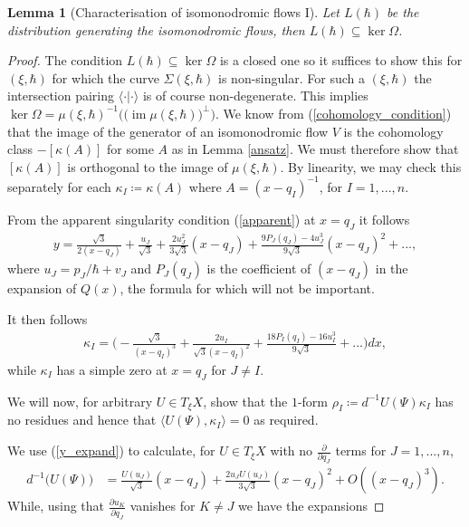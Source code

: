 \documentclass[a4paper,12pt,reqno]{amsart}
\newcounter{counter2}
\numberwithin{equation}{section}
\numberwithin{counter2}{section}
\newcounter{counter3}
\newtheorem{lemma}[counter2]{Lemma}
\newcommand{\im}{\operatorname{im}}
\begin{document}
\begin{lemma}[Characterisation of isomonodromic flows I]\label{flows_in_kernel}
 Let $L(\hbar)$ be the distribution generating the isomonodromic flows,  then $L(\hbar) \subseteq \operatorname{ker} \Omega$.
\end{lemma}
\begin{proof} The condition $L(\hbar) \subseteq \operatorname{ker} \Omega$ is a closed one so it suffices to show this for $(\xi,\hbar)$ for which the curve $\Sigma(\xi,\hbar)$ is non-singular. 
For such a  $(\xi,\hbar)$ the intersection pairing $\langle \cdot | \cdot \rangle$ is of course non-degenerate.  This implies $\operatorname{ker} \Omega =\mu(\xi,\hbar)^{-1}{( (\im \mu(\xi,\hbar)})^{\perp})$.  We know from (\ref{cohomology_condition}) that the image of the generator of an isomonodromic flow $V$ is the cohomology class $-[\kappa(A)]$ for some $A$ as in Lemma \ref{ansatz}.  We must therefore show that $[\kappa(A)]$ is orthogonal to the image of $\mu(\xi,\hbar)$.  By linearity,  we may check this separately for each $\kappa_I \coloneqq \kappa(A)$ where $A = (x-q_I)^{-1}$,  for $I = 1,...,n$.  \par 
From the apparent singularity condition (\ref{apparent}) at $x = q_J$ it follows
\begin{align}\label{y_expand}
y = \frac{\sqrt{3}}{2(x-q_J)} + \frac{u_J}{\sqrt{3}} + \frac{2u_J^2}{3\sqrt{3}}(x-q_J) + \frac{9P_J(q_J)-4u_J^3}{9\sqrt{3}}(x-q_J)^2 + ...  , 
\end{align}
where $u_J = p_J/\hbar + v_J$ and $P_J(q_J)$ is the coefficient of $(x-q_J)$ in the expansion of $Q(x)$,  the formula for which will not be important.  \par 
It then follows 
\begin{align}
\kappa_I = \Bigg( -\frac{\sqrt{3}}{(x-q_I)^3} + \frac{2u_I}{\sqrt{3}(x-q_I)^2} + \frac{18P_I(q_I)-16u_I^3}{9\sqrt{3}} + ...  \Bigg) dx,  
\end{align}
while $\kappa_I$ has a simple zero at $x = q_J$ for $J \ne I$.  \par 
We will now,   for arbitrary $U \in T_{\xi}X$,  show that the $1$-form $
\rho_I \coloneqq d^{-1} U(\Psi) \kappa_I 
$  has no residues and hence that $\langle U(\Psi), \kappa_I \rangle = 0$ as required.  \par 
We use (\ref{y_expand}) to calculate,  for $U \in T_{\xi}X$ with no $\frac{\partial}{\partial q_J}$ terms for  $J = 1,...,n$,  
\begin{align}
d^{-1} \big(U(\Psi)\big) &= \frac{U(u_J)}{\sqrt{3}}(x-q_J) + \frac{2u_JU(u_J)}{3\sqrt{3}}(x-q_J)^2 + O((x-q_J)^3).   \label{magic_expansion_1}
\end{align}
While,  using that $\frac{\partial u_K}{\partial q_J}$ vanishes for $K \ne J$ we have the expansions


\end{proof}
\end{document}
